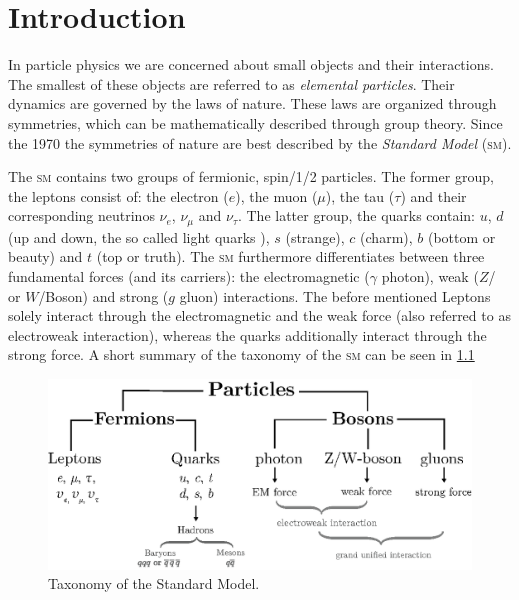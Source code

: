 \documentclass[../../index.tex]{subfiles}
\begin{document}
\chapter{Introduction}
In particle physics we are concerned about small objects and their interactions.
The smallest of these objects are referred to as \textit{elemental particles}.
Their dynamics are governed by the laws of nature. These laws are organized
through symmetries, which can be mathematically described through group theory.
Since the 1970 the symmetries of nature are best described by the \textit{Standard
  Model} (\textsc{sm}).


The \textsc{sm} contains two groups of fermionic, spin\-/1/2 particles. The former group,
the leptons consist of: the electron ($e$), the muon ($\mu$), the tau ($\tau$)
and their corresponding neutrinos $\nu_e$, $\nu_\mu$ and $\nu_\tau$. The latter
group, the quarks contain: $u$, $d$ (up and down, the so called light quarks ),
$s$ (strange), $c$ (charm), $b$ (bottom or beauty) and $t$ (top or truth). The
\textsc{sm} furthermore differentiates between three fundamental forces (and its carriers):
the electromagnetic ($\gamma$ photon), weak ($Z$\-/ or $W$\-/Boson) and strong ($g$
gluon) interactions. The before mentioned Leptons solely interact through the
electromagnetic and the weak force (also referred to as electroweak interaction),
whereas the quarks additionally interact through the strong force. A short
summary of the taxonomy of the \textsc{sm} can be seen in \cref{fig:SMTaxonomy}
\begin{figure}
  \centering
  \includegraphics[width=\textwidth]{./images/standardModelTaxonomy.eps}
  \caption{Taxonomy of the Standard Model.}
  \label{fig:SMTaxonomy}
\end{figure}
\end{document}
